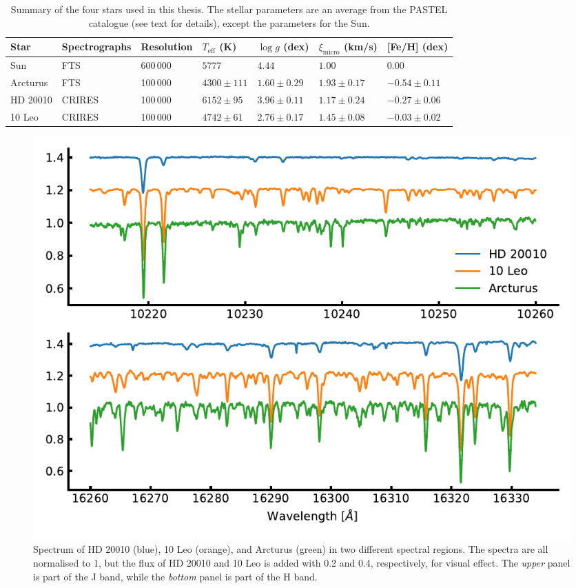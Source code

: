 \begin{table}[htb!]
    \caption{Summary of the four stars used in this thesis. The stellar parameters are an average
             from the PASTEL catalogue \citep{Soubiran2016} (see text for details), except the
             parameters for the Sun.}
    \label{tab:stars}
    \centering
    \begin{tabular}{lllllll}
      \hline\hline
        Star        & Spectrographs  & Resolution  & $T_\mathrm{eff}$ (K) &  $\log g$ (dex)  &   $\xi_\mathrm{micro}$ (km/s)   & [Fe/H] (dex)      \\
      \hline
        Sun         & FTS            & 600\,000    & $5777$               &  $4.44$          &    $1.00$                       & $ 0.00$          \\
        Arcturus    & FTS            & 100\,000    & $4300 \pm 111$       &  $1.60 \pm 0.29$ &    $1.93 \pm 0.17$              & $-0.54 \pm 0.11$ \\
        HD 20010    & CRIRES         & 100\,000    & $6152 \pm  95$       &  $3.96 \pm 0.11$ &    $1.17 \pm 0.24$              & $-0.27 \pm 0.06$ \\
        10 Leo      & CRIRES         & 100\,000    & $4742 \pm  61$       &  $2.76 \pm 0.17$ &    $1.45 \pm 0.08$              & $-0.03 \pm 0.02$ \\
      \hline
    \end{tabular}
\end{table}

\begin{figure}[htpb!]
    \centering
    \includegraphics[width=1.0\linewidth]{figures/NIRspectra.pdf}
    \caption{Spectrum of HD 20010 (blue), 10 Leo (orange), and Arcturus (green) in two different
             spectral regions. The spectra are all normalised to 1, but the flux of HD 20010 and 10
             Leo is added with 0.2 and 0.4, respectively, for visual effect. The \emph{upper} panel
             is part of the J band, while the \emph{bottom} panel is part of the H band.}
    \label{fig:NIRspectra}
\end{figure}


